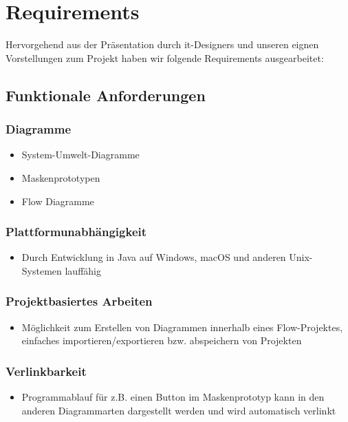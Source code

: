 \section{Requirements}
Hervorgehend aus der Präsentation durch it-Designers und unseren eignen Vorstellungen zum Projekt haben wir folgende Requirements ausgearbeitet:

\subsection{Funktionale Anforderungen}

\subsubsection{Diagramme}
\begin{itemize}
	\item System-Umwelt-Diagramme
	\item Maskenprototypen
	\item Flow Diagramme
\end{itemize}

\subsubsection{Plattformunabhängigkeit}
\begin{itemize}
	\item Durch Entwicklung in Java auf Windows, macOS und anderen Unix-Systemen lauffähig
\end{itemize}

\subsubsection{Projektbasiertes Arbeiten}
\begin{itemize}
	\item Möglichkeit zum Erstellen von Diagrammen innerhalb eines Flow-Projektes, einfaches importieren/exportieren bzw. abspeichern von Projekten
\end{itemize}

\subsubsection{Verlinkbarkeit}
\begin{itemize}
	\item Programmablauf für z.B. einen Button im Maskenprototyp kann in den anderen Diagrammarten dargestellt werden und wird automatisch verlinkt 
\end{itemize}

